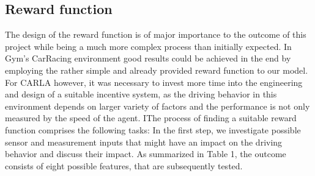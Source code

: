 \documentclass[letterpaper, 10 pt, conference]{ieeeconf}  %
\begin{document}
\subsection{Reward function}
The design of the reward function is of major importance to the outcome of this project while being a much more complex process than initially expected. In Gym's CarRacing environment good results could be achieved in the end by employing the rather simple and already provided reward function to our model. For CARLA however, it was necessary to invest more time into the engineering and design of a suitable incentive system, as the driving behavior in this environment depends on larger variety of factors and the performance is not only measured by the speed of the agent. IThe process of finding a suitable reward function comprises the following tasks: \newline 
In the first step, we investigate possible sensor and measurement inputs that might have an impact on the driving behavior and discuss their impact. As summarized in Table 1, the outcome consists of eight possible features, that are subsequently tested.
\end{document}
